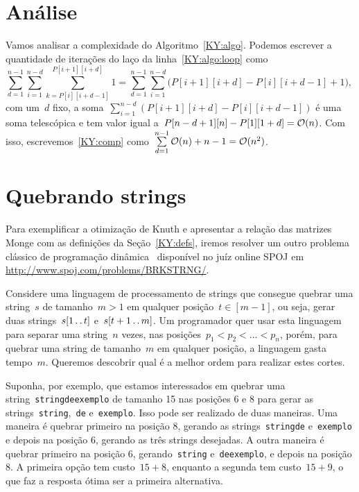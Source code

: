 
\section{Análise}

Vamos analisar a complexidade do Algoritmo~\ref{KY:algo}. Podemos escrever a quantidade de iterações do laço da linha~\ref{KY:algo:loop} como
\begin{equation} \label{KY:comp}
{\sum\limits_{d = 1}^{n-1} \sum\limits_{i=1}^{n-d} \sum\limits_{k=P[i][i+d-1]}^{P[i+1][i+d]} 1 = \sum\limits_{d = 1}^{n-1} \sum\limits_{i=1}^{n-d} ( P[i+1][i+d] - P[i][i+d-1] + 1} ) \text{, }
\end{equation}
com um~$d$ fixo, a soma~$\sum\limits_{i=1}^{n-d} ( P[i+1][i+d] - P[i][i+d-1] )$ é uma soma telescópica e tem valor igual a~$P[n-d+1][n] - P[1][1+d] = \mathcal{O}(n)$. Com isso, escrevemos~\eqref{KY:comp} como~$\sum\limits_{d=1}^{n-1} \mathcal{O}(n) + n - 1 = \mathcal{O}(n^2)$.


\section{Quebrando strings}

Para exemplificar a otimização de Knuth e apresentar a relação das matrizes Monge com as definições da Seção~\ref{KY:defs}, iremos resolver um outro problema clássico de programação dinâmica~\cite[Exercício~15-9]{CLRS} disponível no juíz online SPOJ em \url{http://www.spoj.com/problems/BRKSTRNG/}. 

Considere uma linguagem de processamento de strings que consegue quebrar uma string~$s$ de tamanho~$m > 1$ em qualquer posição~$t \in [m-1]$, ou seja, gerar duas strings~$s[1 \,.\,.\, t]$ e~$s[t+1 \,.\,.\, m]$. Um programador quer usar esta linguagem para separar uma string~$n$ vezes, nas posições~${p_1 < p_2 < \dots < p_{n}}$, porém, para quebrar uma string de tamanho~$m$ em qualquer posição, a linguagem gasta tempo~$m$. Queremos descobrir qual é a melhor ordem para realizar estes cortes. 

Suponha, por exemplo, que estamos interessados em quebrar uma string~\texttt{stringdeexemplo} de tamanho 15 nas posições 6 e 8 para gerar as strings~\texttt{string},~\texttt{de} e~\texttt{exemplo}. Isso pode ser realizado de duas maneiras. Uma maneira é quebrar primeiro na posição 8, gerando as strings~\texttt{stringde} e~\texttt{exemplo} e depois na posição 6, gerando as três strings desejadas. A outra maneira é quebrar primeiro na posição 6, gerando~\texttt{string} e~\texttt{deexemplo}, e depois na posição 8. A primeira opção tem custo~$15 + 8$, enquanto a segunda tem custo~$15 + 9$, o que faz a resposta ótima ser a primeira alternativa.

